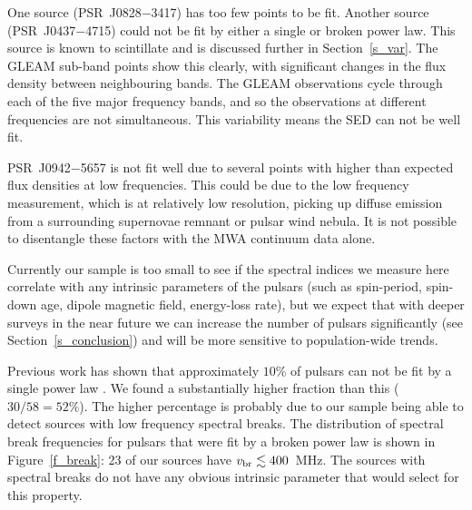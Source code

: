 \documentclass{pasa}%
\newcommand{\changed}[1]{{#1}}
\begin{document}
One source (PSR~J0828$-$3417) has too few points to be fit. Another source (PSR~J0437$-$4715) could not be fit by either a single or broken power law. This source is known to scintillate \citep{bell16} and is discussed further in Section~\ref{s_var}. \changed{The GLEAM sub-band points show this clearly, with significant changes in the flux density between neighbouring bands. The GLEAM observations cycle through each of the five major frequency bands, and so the observations at different frequencies are not simultaneous.} This variability means the SED can not be well fit.

PSR~J0942$-$5657 is not fit well due to several points with higher than
expected flux densities at low frequencies. This could be due to the low
frequency measurement, which is at relatively low resolution, picking up
diffuse emission from a surrounding supernovae remnant or pulsar wind
nebula. It is not possible to disentangle these factors with the MWA continuum data alone.

Currently our sample is too small to see if the spectral indices we measure here correlate with any intrinsic parameters of the pulsars (such as spin-period, spin-down age, dipole magnetic field, energy-loss rate), but we expect that with deeper surveys in the near future we can increase the number of pulsars significantly (see Section~\ref{s_conclusion}) and will be more sensitive to population-wide trends.

Previous work has shown that approximately $10\%$ of pulsars can not be fit by a single power law \citep{maron00}.
We found a substantially higher fraction than this ($30/58 = 52\%$).
The higher percentage is probably due to our sample being able to detect sources with low frequency spectral breaks. The distribution of spectral break frequencies for pulsars that were fit by a broken power law is shown in Figure~\ref{f_break}: 23 of our sources have $v_{\rm br} \lesssim 400$~MHz. The sources with spectral breaks do not have any obvious intrinsic parameter that would select for this property.
\end{document}
